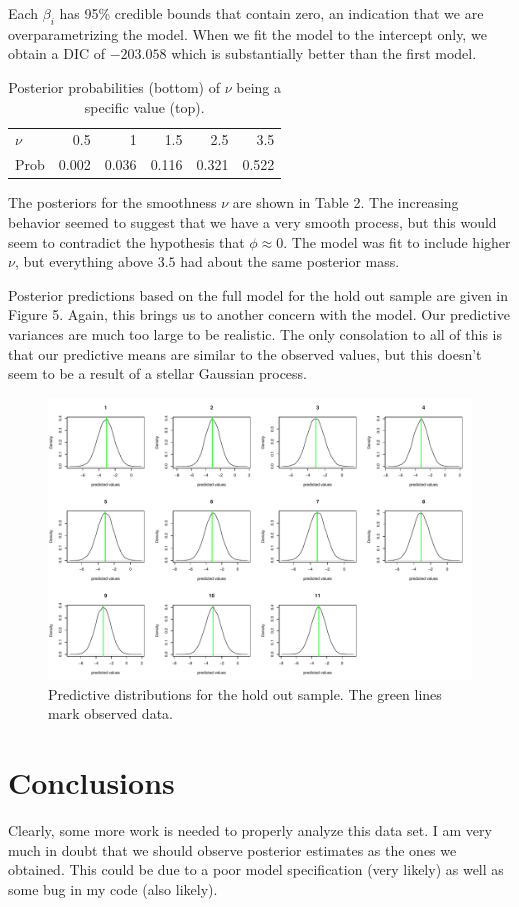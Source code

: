 \documentclass[12pt]{article}
\begin{document}
Each $\beta_i$ has 95\% credible bounds that contain zero, an indication that we are overparametrizing the model. When we fit the model to the intercept only, we obtain a DIC of $-203.058$ which is substantially better than the first model.

\begin{table}[ht]
\begin{center}
\begin{tabular}{lrrrrr}
\hline\hline
$\nu$ & 0.5 & 1 & 1.5 & 2.5 & 3.5 \\
Prob  & 0.002 & 0.036 & 0.116 & 0.321 & 0.522 \\
\hline\hline
\end{tabular}
\end{center}
\caption{Posterior probabilities (bottom) of $\nu$ being a specific value (top).}
\end{table}

The posteriors for the smoothness $\nu$ are shown in Table 2. The increasing behavior seemed to suggest that we have a very smooth process, but this would seem to contradict the hypothesis that $\phi\approx 0$. The model was fit to include higher $\nu$, but everything above $3.5$ had about the same posterior mass.
\bigskip

Posterior predictions based on the full model for the hold out sample are given in Figure 5. Again, this brings us to another concern with the model. Our predictive variances are much too large to be realistic. The only consolation to all of this is that our predictive means are similar to the observed values, but this doesn't seem to be a result of a stellar Gaussian process.

\begin{figure}[ht]
\begin{center}
\includegraphics[scale=0.40]{figs/prediction.pdf}
\end{center}
\caption{Predictive distributions for the hold out sample. The green lines mark observed data.}
\end{figure}

\section{Conclusions}

Clearly, some more work is needed to properly analyze this data set. I am very much in doubt that we should observe posterior estimates as the ones we obtained. This could be due to a poor model specification (very likely) as well as some bug in my code (also likely).
\end{document}

